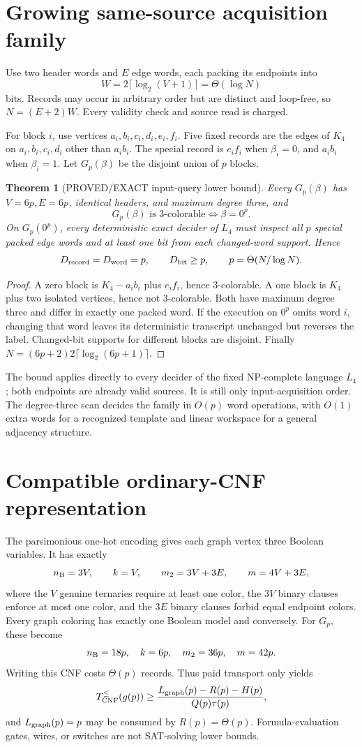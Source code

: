 \documentclass[11pt]{article}
\newtheorem{theorem}{Theorem}
\begin{document}
\section{Growing same-source acquisition family}
Use two header words and \(E\) edge words, each packing its endpoints into
\[
 W=2\lceil\log_2(V+1)\rceil=\Theta(\log N)
\]
bits. Records may occur in arbitrary order but are distinct and loop-free, so
\(N=(E+2)W\). Every validity check and source read is charged.

For block \(i\), use vertices \(a_i,b_i,c_i,d_i,e_i,f_i\). Five fixed records
are the edges of \(K_4\) on \(a_i,b_i,c_i,d_i\) other than \(a_ib_i\).
The special record is \(e_if_i\) when \(\beta_i=0\), and \(a_ib_i\) when
\(\beta_i=1\). Let \(G_p(\beta)\) be the disjoint union of \(p\) blocks.

\begin{theorem}[PROVED/EXACT input-query lower bound]
Every \(G_p(\beta)\) has \(V=6p,E=6p\), identical headers, and maximum degree
three, and
\[
 G_p(\beta)\text{ is 3-colorable}\iff\beta=0^p.
\]
On \(G_p(0^p)\), every deterministic exact decider of \(L_4\) must inspect
all \(p\) special packed edge words and at least one bit from each changed-word
support. Hence
\[
 D_{\rm record}=D_{\rm word}=p,\qquad D_{\rm bit}\ge p,\qquad
 p=\Theta(N/\log N).
\]
\end{theorem}
\begin{proof}
A zero block is \(K_4-a_ib_i\) plus \(e_if_i\), hence 3-colorable. A one
block is \(K_4\) plus two isolated vertices, hence not 3-colorable. Both have
maximum degree three and differ in exactly one packed word. If the execution
on \(0^p\) omits word \(i\), changing that word leaves its deterministic
transcript unchanged but reverses the label. Changed-bit supports for
different blocks are disjoint. Finally
\(N=(6p+2)2\lceil\log_2(6p+1)\rceil\).
\end{proof}
The bound applies directly to every decider of the fixed NP-complete language
\(L_4\); both endpoints are already valid sources. It is still only
input-acquisition order. The degree-three scan decides the family in \(O(p)\)
word operations, with \(O(1)\) extra words for a recognized template and
linear workspace for a general adjacency structure.
\section{Compatible ordinary-CNF representation}
The parsimonious one-hot encoding gives each graph vertex three Boolean
variables. It has exactly
\[
 n_{\rm B}=3V,\qquad k=V,\qquad m_2=3V+3E,\qquad m=4V+3E,
\]
where the \(V\) genuine ternaries require at least one color, the \(3V\)
binary clauses enforce at most one color, and the \(3E\) binary clauses forbid
equal endpoint colors. Every graph coloring has exactly one Boolean model
and conversely. For \(G_p\), these become
\[
 n_{\rm B}=18p,\quad k=6p,\quad m_2=36p,\quad m=42p.
\]
Writing this CNF costs \(\Theta(p)\) records. Thus paid transport only yields
\[
 T_{\rm CNF}^{\le}(g(p))
 \ge \frac{L_{\rm graph}(p)-R(p)-H(p)}{Q(p)\tau(p)},
\]
and \(L_{\rm graph}(p)=p\) may be consumed by \(R(p)=\Theta(p)\).
Formula-evaluation gates, wires, or switches are not SAT-solving lower bounds.
\end{document}
